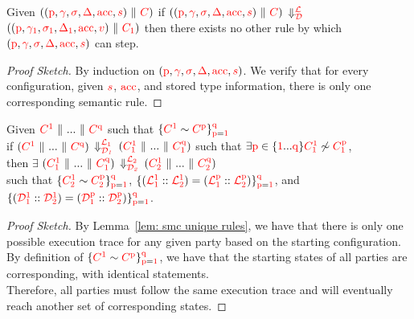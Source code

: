 \begin{lemma}%
\label{lem: smc unique rules}
Given $((\RT\pid, \RT\gamma, \RT\sigma, \RT\DMap, \RT\Acc, \RT\stmt) \Mid \RT\Config)$
if $((\RT\pid, \RT\gamma, \RT\sigma, \RT\DMap, \RT\Acc, \RT\stmt) \Mid \RT\Config)$ $\Deval{\RT\locLL}{\RT\codeLL}$
   $((\RT\pid, \RT{\gamma_1}, \RT{\sigma_1}, \RT{\DMap_1}, \RT\Acc, \RT\val) \Mid \RT{\Config_1})$
then there exists no other rule by which $(\RT\pid, \RT\gamma, \RT\sigma, \RT\DMap, \RT\Acc, \RT\stmt)$ can step. 
\end{lemma}
\begin{proof}[Proof Sketch]%
By induction on $(\RT\pid, \RT\gamma, \RT\sigma, \RT\DMap, \RT\Acc, \RT\stmt)$. 
We verify that for every configuration, given $\RT\stmt$, $\RT\Acc$, and stored type information, there is only one corresponding semantic rule.
\end{proof}







\begin{theorem}[Confluence]%
\label{thm: smc confluence}
Given $\RT{\Config^\pidA} \Mid ... \Mid \RT{\Config^\pidZ}$ such that $\{\RT{\Config^\pidA} \sim \RT{\Config^\pid}\}^{\RT\pidZ}_{\RT\pid = \RT\pidA}$ 
\\
if $(\RT{\Config^\pidA} \Mid ... \Mid \RT{\Config^\pidZ})$ $\Deval{\RT{\locLL_1}}{\RT{\codeLL_1}}$ $(\RT{\Config^\pidA_1} \Mid ... \Mid \RT{\Config^\pidZ_1})$ such that $\exists \RT\pid\in\{\RT\pidA...\RT\pidZ\} \RT{\Config^\pidA_1} \not\sim \RT{\Config^\pid_1}$, 
\\
then $\exists$ $(\RT{\Config^\pidA_1} \Mid ... \Mid \RT{\Config^\pidZ_1})$ $\Deval{\RT{\locLL_2}}{\RT{\codeLL_2}}$ $(\RT{\Config^\pidA_2} \Mid ... \Mid \RT{\Config^\pidZ_2})$
\\ 
such that $\{\RT{\Config^\pidA_2} \sim \RT{\Config^\pid_2}\}^{\RT\pidZ}_{\RT\pid = \RT\pidA}$, 
$\{(\RT{\locLL^\pidA_1}\addL\RT{\locLL^\pidA_2}) = (\RT{\locLL^\pid_1}\addL\RT{\locLL^\pid_2})\}^{\RT\pidZ}_{\RT\pid = \RT\pidA}$, 
and $\{(\RT{\codeLL^\pidA_1}\addC\RT{\codeLL^\pidA_2}) = (\RT{\codeLL^\pid_1}\addC\RT{\codeLL^\pid_2})\}^{\RT\pidZ}_{\RT\pid = \RT\pidA}$.
\end{theorem}

\begin{proof}[Proof Sketch]%
By Lemma~\ref{lem: smc unique rules}, we have that there is only one possible execution trace for any given party based on the starting configuration. 
~\\ 
By definition of $\{\RT{\Config^\pidA} \sim \RT{\Config^\pid}\}^{\RT\pidZ}_{\RT\pid = \RT\pidA}$, 
we have that the starting states of all parties are corresponding, with identical statements. 
~\\ 
Therefore, all parties must follow the same execution trace and will eventually reach another set of corresponding states.
\end{proof}




